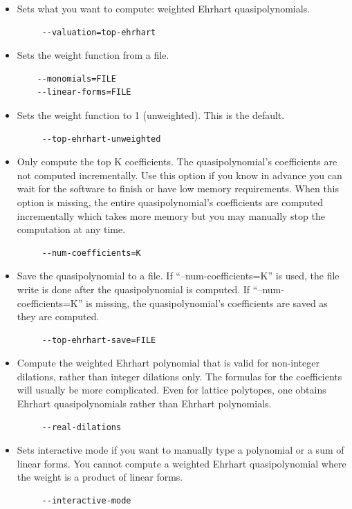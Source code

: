 \documentclass{article}
\begin{document}
\begin{itemize}
\item Sets what you want to compute: weighted Ehrhart quasipolynomials. 
        \begin{verbatim}
     --valuation=top-ehrhart
        \end{verbatim}  
\item Sets the weight function from a file.
        \begin{verbatim}
    --monomials=FILE
    --linear-forms=FILE
        \end{verbatim}  
\item Sets the weight function to 1 (unweighted). This is the default. 
        \begin{verbatim}
     --top-ehrhart-unweighted
        \end{verbatim} 
\item Only compute the top K coefficients. The quasipolynomial's coefficients are not computed incrementally. Use this option if you know in advance you can wait for the software to finish or have low memory requirements. When this option is missing, the entire quasipolynomial's coefficients are computed incrementally which takes more memory but you may manually stop the computation at any time.
        \begin{verbatim}
     --num-coefficients=K
        \end{verbatim}
\item Save the quasipolynomial to a file. If ``--num-coefficients=K'' is
  used, the file write is done after the quasipolynomial is computed. If
  ``--num-coefficients=K'' is missing, the quasipolynomial's coefficients
  are saved as they are computed. 
        \begin{verbatim}
     --top-ehrhart-save=FILE
        \end{verbatim}          
\item Compute the weighted Ehrhart polynomial that is valid for non-integer
  dilations, rather than integer dilations only. 
  The formulas for the
  coefficients will usually be more complicated.  Even for lattice polytopes,
  one obtains Ehrhart quasipolynomials rather than Ehrhart polynomials.
        \begin{verbatim}
     --real-dilations
        \end{verbatim}          
\item Sets interactive mode if you want to manually type a polynomial or a sum of linear forms. You cannot compute a weighted Ehrhart quasipolynomial where the weight is a product of linear forms.
        \begin{verbatim}
     --interactive-mode
        \end{verbatim}          
\end{itemize}
\end{document}
